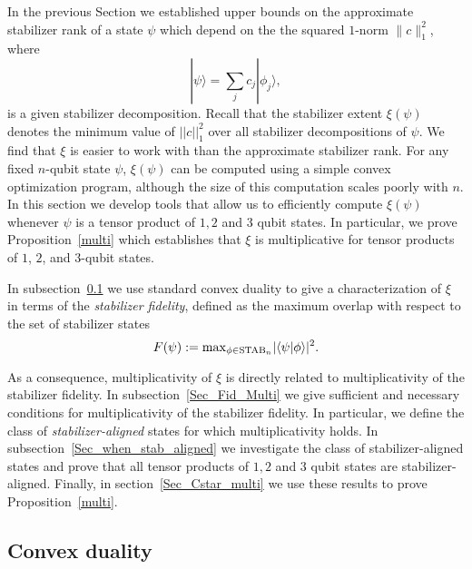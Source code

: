 In the previous Section we established upper bounds on the approximate stabilizer rank of a state $\psi$ which depend on the the squared $1$-norm $\|c\|_1^2$, where
\[
|\psi\rangle=\sum_{j}c_j |\phi_j\rangle,
\]
is a given stabilizer decomposition.   Recall that the stabilizer extent $\xi(\psi)$  denotes the minimum value of $|| c ||_1^2$ over all stabilizer decompositions of $\psi$. We find that $\xi$ is easier to work with than the approximate stabilizer rank. For any fixed $n$-qubit state $\psi$, $\xi(\psi)$ can be computed using a simple convex optimization program, although the size of this computation scales poorly with $n$. In this section we develop tools that allow us to efficiently compute $\xi(\psi)$ whenever $\psi$ is a tensor product of $1, 2$ and $3$ qubit states. In particular, we prove Proposition~\ref{multi} which establishes that $\xi$ is multiplicative for tensor products of $1$, $2$, and $3$-qubit states. 

In subsection~\ref{Sec_convex_dual} we use standard convex duality to give a characterization of $\xi$ in terms of the \textit{stabilizer fidelity}, defined as the maximum overlap with respect to the set of stabilizer states
\begin{equation}
F( \psi ) := \mathrm{max}_{\phi \in \mathrm{STAB}_n} |\langle \psi\vert \phi\rangle|^2.
\end{equation}

As a consequence, multiplicativity of $\xi$ is directly related to multiplicativity of the stabilizer fidelity. In subsection~\ref{Sec_Fid_Multi} we give sufficient and necessary conditions for multiplicativity of the stabilizer fidelity. In particular, we define the class of \textit{stabilizer-aligned} states for which multiplicativity holds.  In subsection~\ref{Sec_when_stab_aligned} we investigate the class of stabilizer-aligned states and prove that all tensor products of $1,2$ and $3$ qubit states are stabilizer-aligned.  Finally, in section~\ref{Sec_Cstar_multi} we use these results to prove Proposition~\ref{multi}. 

\subsection{Convex duality}
\label{Sec_convex_dual}

